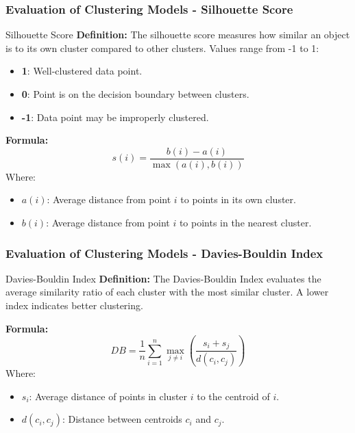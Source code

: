 \documentclass[aspectratio=169]{beamer}
\begin{document}
\begin{frame}[fragile]
    \frametitle{Evaluation of Clustering Models - Silhouette Score}
    \begin{block}{Silhouette Score}
        \textbf{Definition:} The silhouette score measures how similar an object is to its own cluster compared to other clusters. Values range from -1 to 1:
        \begin{itemize}
            \item \textbf{1}: Well-clustered data point.
            \item \textbf{0}: Point is on the decision boundary between clusters.
            \item \textbf{-1}: Data point may be improperly clustered.
        \end{itemize}

        \textbf{Formula:}
        \begin{equation}
            s(i) = \frac{b(i) - a(i)}{\max(a(i), b(i))}
        \end{equation}
        Where:
        \begin{itemize}
            \item $a(i)$: Average distance from point $i$ to points in its own cluster.
            \item $b(i)$: Average distance from point $i$ to points in the nearest cluster.
        \end{itemize}
    \end{block}
\end{frame}

\begin{frame}[fragile]
    \frametitle{Evaluation of Clustering Models - Davies-Bouldin Index}
    \begin{block}{Davies-Bouldin Index}
        \textbf{Definition:} The Davies-Bouldin Index evaluates the average similarity ratio of each cluster with the most similar cluster. A lower index indicates better clustering.

        \textbf{Formula:}
        \begin{equation}
            DB = \frac{1}{n} \sum_{i=1}^{n} \max_{j \neq i} \left( \frac{s_i + s_j}{d(c_i, c_j)} \right)
        \end{equation}
        Where:
        \begin{itemize}
            \item $s_i$: Average distance of points in cluster $i$ to the centroid of $i$.
            \item $d(c_i, c_j)$: Distance between centroids $c_i$ and $c_j$.
        \end{itemize}
    \end{block}
\end{frame}
\end{document}
